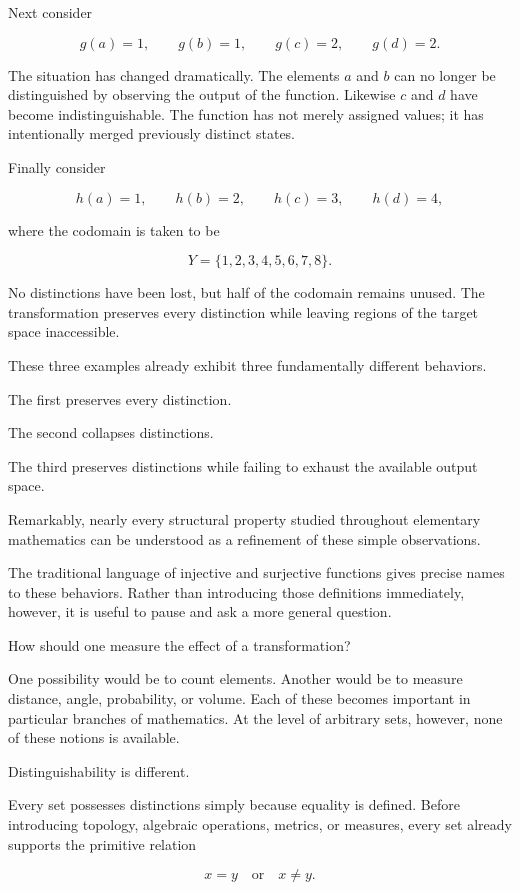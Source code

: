\documentclass[11pt]{book}
\numberwithin{equation}{chapter}
\theoremstyle{definition}
\theoremstyle{plain}
\theoremstyle{remark}
\begin{document}
Next consider

\[
g(a)=1,\qquad
g(b)=1,\qquad
g(c)=2,\qquad
g(d)=2.
\]

The situation has changed dramatically. The elements \(a\) and \(b\) can no longer be distinguished by observing the output of the function. Likewise \(c\) and \(d\) have become indistinguishable. The function has not merely assigned values; it has intentionally merged previously distinct states.

Finally consider

\[
h(a)=1,\qquad
h(b)=2,\qquad
h(c)=3,\qquad
h(d)=4,
\]

where the codomain is taken to be

\[
Y=\{1,2,3,4,5,6,7,8\}.
\]

No distinctions have been lost, but half of the codomain remains unused. The transformation preserves every distinction while leaving regions of the target space inaccessible.

These three examples already exhibit three fundamentally different behaviors.

The first preserves every distinction.

The second collapses distinctions.

The third preserves distinctions while failing to exhaust the available output space.

Remarkably, nearly every structural property studied throughout elementary mathematics can be understood as a refinement of these simple observations.

The traditional language of injective and surjective functions gives precise names to these behaviors. Rather than introducing those definitions immediately, however, it is useful to pause and ask a more general question.

How should one measure the effect of a transformation?

One possibility would be to count elements. Another would be to measure distance, angle, probability, or volume. Each of these becomes important in particular branches of mathematics. At the level of arbitrary sets, however, none of these notions is available.

Distinguishability is different.

Every set possesses distinctions simply because equality is defined. Before introducing topology, algebraic operations, metrics, or measures, every set already supports the primitive relation

\[
x=y
\quad\text{or}\quad
x\neq y.
\]
\end{document}

